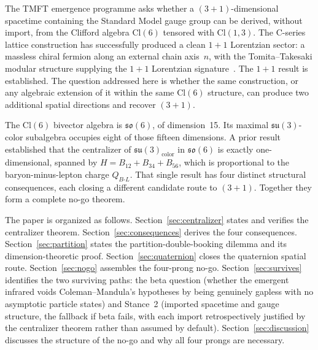 \documentclass[aip,jmp,amsmath,amssymb,reprint,author-year]{revtex4-2}
\begin{document}
The TMFT emergence programme asks whether a $(3{+}1)$-dimensional
spacetime containing the Standard Model gauge group can be derived,
without import, from the Clifford algebra $\mathrm{Cl}(6)$ tensored with
$\mathrm{Cl}(1,3)$.  The C-series lattice construction has successfully
produced a clean $1{+}1$ Lorentzian sector: a massless chiral fermion
along an external chain axis~$n$, with the Tomita--Takesaki modular
structure supplying the $1{+}1$ Lorentzian
signature~\citep{C4consolidation}.  The $1{+}1$ result is established.
The question addressed here is whether the same construction, or any
algebraic extension of it within the same $\mathrm{Cl}(6)$ structure, can
produce two additional spatial directions and recover $(3{+}1)$.

The $\mathrm{Cl}(6)$ bivector algebra is $\mathfrak{so}(6)$, of
dimension~15.  Its maximal $\mathfrak{su}(3)$-color subalgebra occupies
eight of those fifteen dimensions.  A prior
result~\citep{centralizercheck} established that the centralizer of
$\mathfrak{su}(3)_{\mathrm{color}}$ in $\mathfrak{so}(6)$ is exactly
one-dimensional, spanned by $H = B_{12} + B_{34} + B_{56}$, which is
proportional to the baryon-minus-lepton charge $Q_{B\text{-}L}$.  That
single result has four distinct structural consequences, each closing a
different candidate route to $(3{+}1)$.  Together they form a complete
no-go theorem.

The paper is organized as follows.  Section~\ref{sec:centralizer} states
and verifies the centralizer theorem.  Section~\ref{sec:consequences}
derives the four consequences.  Section~\ref{sec:partition} states the
partition-double-booking dilemma and its dimension-theoretic proof.
Section~\ref{sec:quaternion} closes the quaternion spatial route.
Section~\ref{sec:nogo} assembles the four-prong no-go.
Section~\ref{sec:survives} identifies the two surviving paths: the beta
question (whether the emergent infrared voids Coleman--Mandula's
hypotheses by being genuinely gapless with no asymptotic particle states)
and Stance~2 (imported spacetime and gauge structure, the fallback if
beta fails, with each import retrospectively justified by the centralizer
theorem rather than assumed by default).
Section~\ref{sec:discussion} discusses the structure of the no-go and why
all four prongs are necessary.
\end{document}
